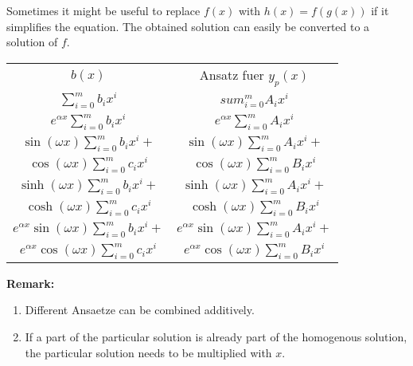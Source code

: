\begin{remark}
	Sometimes it might be useful to replace $f(x)$ with $h(x) = f(g(x))$ if it simplifies the equation.
	The obtained solution can easily be converted to a solution of $f$.
\end{remark}

\begin{concept}
	\begin{tabular}{| c | c |}
		\hline
		$b(x)$													&	Ansatz fuer $y_p(x)$ \\
		\hhline
		$\sum_{i=0}^m b_i x^i$									&	$sum_{i=0}^m A_i x^i$ \\
		\hline
		$e^{\alpha x} \sum_{i=0}^m b_i x^i$						&	$e^{\alpha x} \sum_{i=0}^m A_i x^i$ \\	
		\hline
		$\sin(\omega x) \sum_{i=0}^m b_i x^i +$                  &   $\sin(\omega x) \sum_{i=0}^m A_i x^i +$ \\
		$\cos(\omega x) \sum_{i=0}^m c_i x^i$	                &	$\cos(\omega x) \sum_{i=0}^m B_i x^i$ \\
		\hline
		$\sinh(\omega x) \sum_{i=0}^m b_i x^i +$               	&	$\sinh(\omega x) \sum_{i=0}^m A_i x^i +$ \\
		$\cosh(\omega x) \sum_{i=0}^m c_i x^i$				    &	$\cosh(\omega x) \sum_{i=0}^m B_i x^i$ \\
		\hline
		$e^{\alpha x} \sin(\omega x) \sum_{i=0}^m b_i x^i +$	&	$e^{\alpha x} \sin(\omega x) \sum_{i=0}^m A_i x^i +$ \\
	    $e^{\alpha x} \cos(\omega x) \sum_{i=0}^m c_i x^i$	    &	$e^{\alpha x} \cos(\omega x) \sum_{i=0}^m B_i x^i$ \\
		\hline
	\end{tabular}
	$ $\\
	\textbf{Remark:}
	\begin{enumerate}
		\item Different Ansaetze can be combined additively.
		\item If a part of the particular solution is already part of the homogenous solution, the particular solution needs to be multiplied with $x$. 
	\end{enumerate}
\end{concept}


